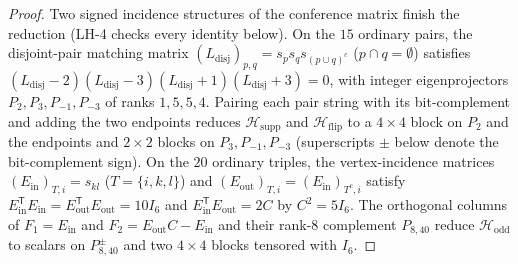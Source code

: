 \begin{proof}
Two signed incidence structures of the conference matrix finish the reduction (LH-4 checks every identity below).
On the $15$ ordinary pairs, the disjoint-pair matching matrix $(L_{\mathrm{disj}})_{p,q}=s_ps_qs_{(p\cup q)^c}$
($p\cap q=\emptyset$) satisfies $(L_{\mathrm{disj}}-2)(L_{\mathrm{disj}}-3)(L_{\mathrm{disj}}+1)(L_{\mathrm{disj}}+3)=0$,
with integer eigenprojectors $P_2,P_3,P_{-1},P_{-3}$ of ranks $1,5,5,4$. Pairing each pair string with its
bit-complement and adding the two endpoints reduces $\mathcal H_{\mathrm{supp}}$ and $\mathcal H_{\mathrm{flip}}$ to a
$4\times4$ block on $P_2$ and the endpoints and $2\times2$ blocks on $P_3,P_{-1},P_{-3}$ (superscripts $\pm$ below
denote the bit-complement sign). On the $20$ ordinary triples, the vertex-incidence matrices
$(E_{\mathrm{in}})_{T,i}=s_{kl}$ ($T=\{i,k,l\}$) and $(E_{\mathrm{out}})_{T,i}=(E_{\mathrm{in}})_{T^c,i}$ satisfy
$E_{\mathrm{in}}^{\mathsf T}E_{\mathrm{in}}=E_{\mathrm{out}}^{\mathsf T}E_{\mathrm{out}}=10I_6$ and
$E_{\mathrm{in}}^{\mathsf T}E_{\mathrm{out}}=2C$ by $C^2=5I_6$. The orthogonal columns of $F_1=E_{\mathrm{in}}$ and
$F_2=E_{\mathrm{out}}C-E_{\mathrm{in}}$ and their rank-$8$ complement $P_{8,40}$ reduce $\mathcal H_{\mathrm{odd}}$
to scalars on $P_{8,40}^\pm$ and two $4\times4$ blocks tensored with $I_6$.


\end{proof}
